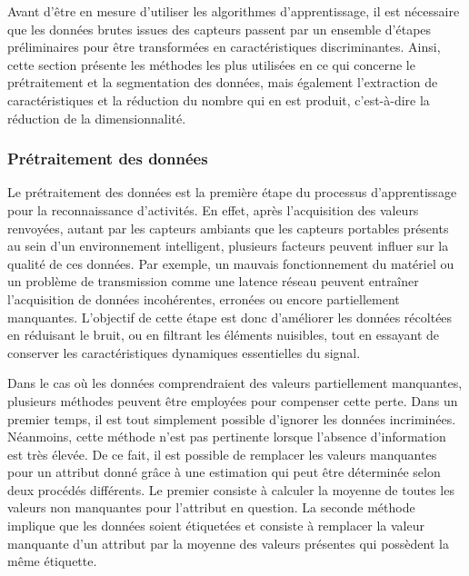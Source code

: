 Avant d'être en mesure d'utiliser les algorithmes d'apprentissage, il est nécessaire que les données brutes issues des capteurs passent par un ensemble d'étapes préliminaires pour être transformées en caractéristiques discriminantes. Ainsi, cette section présente les méthodes les plus utilisées en ce qui concerne le prétraitement et la segmentation des données, mais également l'extraction de caractéristiques et la réduction du nombre qui en est produit, c'est-à-dire la réduction de la dimensionnalité.

\subsubsection{Prétraitement des données}

Le prétraitement des données est la première étape du processus d'apprentissage pour la reconnaissance d'activités. En effet, après l'acquisition des valeurs renvoyées, autant par les capteurs ambiants que les capteurs portables présents au sein d'un environnement intelligent, plusieurs facteurs peuvent influer sur la qualité de ces données. Par exemple, un mauvais fonctionnement du matériel ou un problème de transmission comme une latence réseau peuvent entraîner l'acquisition de données incohérentes, erronées ou encore partiellement manquantes. L'objectif de cette étape est donc d'améliorer les données récoltées en réduisant le bruit, ou en filtrant les éléments nuisibles, tout en essayant de conserver les caractéristiques dynamiques essentielles du signal.

Dans le cas où les données comprendraient des valeurs partiellement manquantes, plusieurs méthodes peuvent être employées pour compenser cette perte. Dans un premier temps, il est tout simplement possible d'ignorer les données incriminées. Néanmoins, cette méthode n'est pas pertinente lorsque l'absence d'information est très élevée. De ce fait, il est possible de remplacer les valeurs manquantes pour un attribut donné grâce à une estimation qui peut être déterminée selon deux procédés différents. Le premier consiste à calculer la moyenne de toutes les valeurs non manquantes pour l'attribut en question. La seconde méthode implique que les données soient étiquetées et consiste à remplacer la valeur manquante d'un attribut par la moyenne des valeurs présentes qui possèdent la même étiquette.

